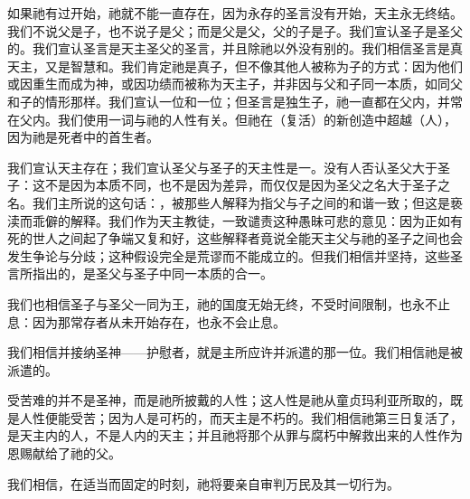如果祂有过开始，祂就不能一直存在，因为永存的圣言没有开始，天主永无终结。我们不说父是子，也不说子是父；而是父是父，父的子是子。我们宣认圣子是圣父的。我们宣认圣言是天主圣父的圣言，并且除祂以外没有别的。我们相信圣言是真天主，又是智慧和。我们肯定祂是真子，但不像其他人被称为子的方式：因为他们或因重生而成为神，或因功绩而被称为天主子，并非因与父和子同一本质，如同父和子的情形那样。我们宣认一位和一位；但圣言是独生子，祂一直都在父内，并常在父内。我们使用一词与祂的人性有关。但祂在（复活）的新创造中超越（人），因为祂是死者中的首生者。\par

我们宣认天主存在；我们宣认圣父与圣子的天主性是一。没有人否认圣父大于圣子：这不是因为本质不同，也不是因为差异，而仅仅是因为圣父之名大于圣子之名。我们主所说的这句话：，被那些人解释为指父与子之间的和谐一致；但这是亵渎而乖僻的解释。我们作为天主教徒，一致谴责这种愚昧可悲的意见：因为正如有死的世人之间起了争端又复和好，这些解释者竟说全能天主父与祂的圣子之间也会发生争论与分歧；这种假设完全是荒谬而不能成立的。但我们相信并坚持，这些圣言所指出的，是圣父与圣子中同一本质的合一。\par

我们也相信圣子与圣父一同为王，祂的国度无始无终，不受时间限制，也永不止息：因为那常存者从未开始存在，也永不会止息。\par

我们相信并接纳圣神——护慰者，就是主所应许并派遣的那一位。我们相信祂是被派遣的。\par

受苦难的并不是圣神，而是祂所披戴的人性；这人性是祂从童贞玛利亚所取的，既是人性便能受苦；因为人是可朽的，而天主是不朽的。我们相信祂第三日复活了，是天主内的人，不是人内的天主；并且祂将那个从罪与腐朽中解救出来的人性作为恩赐献给了祂的父。\par

我们相信，在适当而固定的时刻，祂将要亲自审判万民及其一切行为。\par

\par

